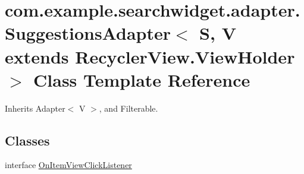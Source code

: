 \hypertarget{classcom_1_1example_1_1searchwidget_1_1adapter_1_1_suggestions_adapter}{}\section{com.\+example.\+searchwidget.\+adapter.\+Suggestions\+Adapter$<$ S, V extends Recycler\+View.\+View\+Holder $>$ Class Template Reference}
\label{classcom_1_1example_1_1searchwidget_1_1adapter_1_1_suggestions_adapter}


Inherits Adapter$<$ V $>$, and Filterable.

\subsection*{Classes}
\begin{DoxyCompactItemize}
\item 
interface \mbox{\hyperlink{interfacecom_1_1example_1_1searchwidget_1_1adapter_1_1_suggestions_adapter_1_1_on_item_view_click_listener}{On\+Item\+View\+Click\+Listener}}
\end{DoxyCompactItemize}
